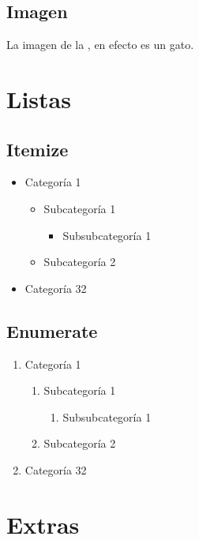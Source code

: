 \subsection{Imagen}\label{sec:imagen}
La imagen  de la , en efecto es un gato.
%
\section{Listas}
\subsection{Itemize}
\begin{itemize} [label = \itz]
    \item Categoría 1
    \begin{itemize} [label = \iitz]
        \item Subcategoría 1
            \begin{itemize} [label = \iiitz]
                \item Subsubcategoría 1
            \end{itemize}
        \item Subcategoría 2
    \end{itemize}
    \item Categoría 32
\end{itemize}
    
\subsection{Enumerate}
\begin{enumerate} [label = \ienum]
    \item Categoría 1
    \begin{enumerate} [label = \iienum]
        \item Subcategoría 1
            \begin{enumerate} [label = \iiienum]
                \item Subsubcategoría 1
            \end{enumerate}
        \item Subcategoría 2
    \end{enumerate}
    \item Categoría 32
\end{enumerate}
%
\section{Extras}
